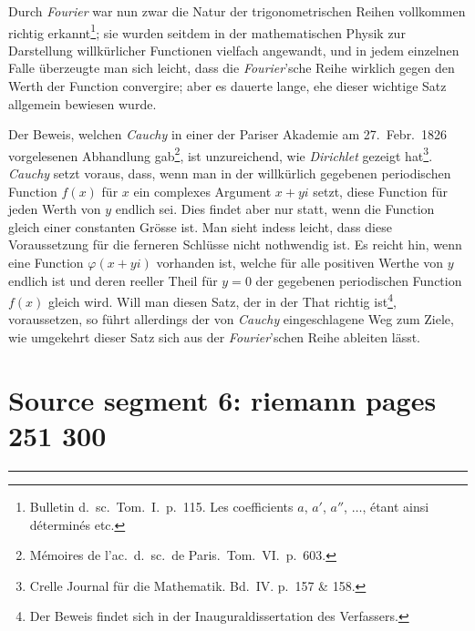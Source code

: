 \documentclass[12pt,a4paper]{book}
\theoremstyle{definition}
\theoremstyle{remark}
\begin{document}
Durch \textit{Fourier} war nun zwar die Natur der trigonometrischen Reihen vollkommen richtig erkannt\footnote{Bulletin d.\ sc.\ Tom.~I.\ p.~115. Les coefficients $a$, $a'$, $a''$, $\ldots$, étant ainsi déterminés etc.}; sie wurden seitdem in der mathematischen Physik zur Darstellung willkürlicher Functionen vielfach angewandt, und in jedem einzelnen Falle überzeugte man sich leicht, dass die \textit{Fourier}'sche Reihe wirklich gegen den Werth der Function convergire; aber es dauerte lange, ehe dieser wichtige Satz allgemein bewiesen wurde.

Der Beweis, welchen \textit{Cauchy} in einer der Pariser Akademie am 27.~Febr.\ 1826 vorgelesenen Abhandlung gab\footnote{Mémoires de l'ac.\ d.\ sc.\ de Paris.\ Tom.~VI.\ p.~603.}, ist unzureichend, wie \textit{Dirichlet} gezeigt hat\footnote{Crelle Journal für die Mathematik. Bd.~IV. p.~157 \& 158.}. \textit{Cauchy} setzt voraus, dass, wenn man in der willkürlich gegebenen periodischen Function $f(x)$ für $x$ ein complexes Argument $x + yi$ setzt, diese Function für jeden Werth von $y$ endlich sei. Dies findet aber nur statt, wenn die Function gleich einer constanten Grösse ist. Man sieht indess leicht, dass diese Voraussetzung für die ferneren Schlüsse nicht nothwendig ist. Es reicht hin, wenn eine Function $\varphi(x + yi)$ vorhanden ist, welche für alle positiven Werthe von $y$ endlich ist und deren reeller Theil für $y = 0$ der gegebenen periodischen Function $f(x)$ gleich wird. Will man diesen Satz, der in der That richtig ist\footnote{Der Beweis findet sich in der Inauguraldissertation des Verfassers.}, voraussetzen, so führt allerdings der von \textit{Cauchy} eingeschlagene Weg zum Ziele, wie umgekehrt dieser Satz sich aus der \textit{Fourier}'schen Reihe ableiten lässt.

\clearpage
\chapter*{Source segment 6: riemann pages 251 300}
\maketitle
\thispagestyle{fancy}
\vspace{-0.5cm}
\hrule
\vspace{0.8cm}






\end{document}
